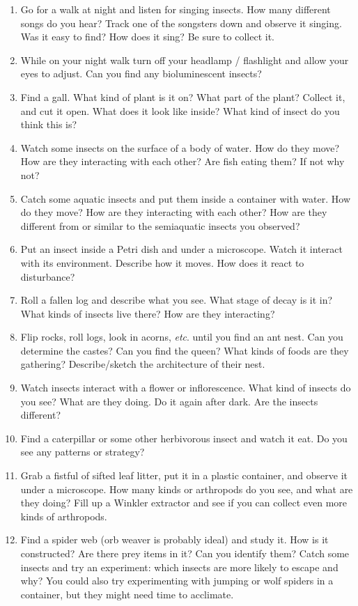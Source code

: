 \documentclass[letterpaper, 11pt]{article}
\begin{document}
\begin{enumerate}
\item Go for a walk at night and listen for singing insects. How many different songs do you hear? Track one of the songsters down and observe it singing. Was it easy to find? How does it sing? Be sure to collect it.
\item While on your night walk turn off your headlamp / flashlight and allow your eyes to adjust. Can you find any bioluminescent insects?
\item Find a gall. What kind of plant is it on? What part of the plant? Collect it, and cut it open. What does it look like inside? What kind of insect do you think this is?
\item Watch some insects on the surface of a body of water. How do they move? How are they interacting with each other? Are fish eating them? If not why not?
\item Catch some aquatic insects and put them inside a container with water. How do they move? How are they interacting with each other? How are they different from or similar to the semiaquatic insects you observed?
\item Put an insect inside a Petri dish and under a microscope. Watch it interact with its environment. Describe how it moves. How does it react to disturbance?
\item Roll a fallen log and describe what you see. What stage of decay is it in? What kinds of insects live there? How are they interacting?
\item Flip rocks, roll logs, look in acorns, \textit{etc}. until you find an ant nest. Can you determine the castes? Can you find the queen? What kinds of foods are they gathering? Describe/sketch the architecture of their nest.
\item Watch insects interact with a flower or inflorescence. What kind of insects do you see? What are they doing. Do it again after dark. Are the insects different?
\item Find a caterpillar or some other herbivorous insect and watch it eat. Do you see any patterns or strategy?
\item Grab a fistful of sifted leaf litter, put it in a plastic container, and observe it under a microscope. How many kinds or arthropods do you see, and what are they doing? Fill up a Winkler extractor and see if you can collect even more kinds of arthropods.
\item Find a spider web (orb weaver is probably ideal) and study it. How is it constructed? Are there prey items in it? Can you identify them? Catch some insects and try an experiment: which insects are more likely to escape and why? You could also try experimenting with jumping or wolf spiders in a container, but they might need time to acclimate.%
\end{enumerate}
\end{document}
